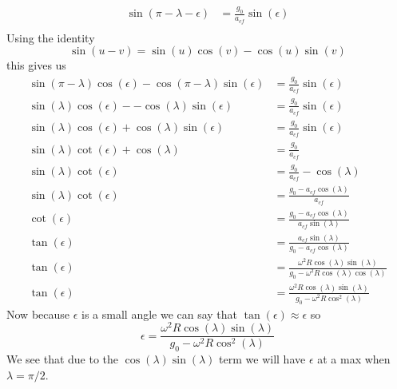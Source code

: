 \documentclass[11pt]{article}
\numberwithin{equation}{section}
\begin{document}
\begin{enumerate}
\begin{align*}
 {\sin(\pi-\lambda-\epsilon)}&= \frac{g_0}{a_{cf}}{\sin(\epsilon)}\\
\end{align*}
Using the identity
$$\sin(u-v) = \sin(u)\cos(v)-\cos(u)\sin(v)$$
this gives us
\begin{align*}
 {\sin(\pi-\lambda)\cos(\epsilon)}- {\cos(\pi-\lambda)\sin(\epsilon)}&= \frac{g_0}{a_{cf}}{\sin(\epsilon)}\\
 {\sin(\lambda)\cos(\epsilon)}- -\cos(\lambda)\sin(\epsilon)&= \frac{g_0}{a_{cf}}{\sin(\epsilon)}\\
 {\sin(\lambda)\cos(\epsilon)}+\cos(\lambda)\sin(\epsilon)&= \frac{g_0}{a_{cf}}{\sin(\epsilon)}\\
 \sin(\lambda)\cot(\epsilon)+\cos(\lambda)&= \frac{g_0}{a_{cf}}\\
 \sin(\lambda)\cot(\epsilon)&= \frac{g_0}{a_{cf}}-\cos(\lambda)\\
 \sin(\lambda)\cot(\epsilon)&= \frac{g_0-a_{cf}\cos(\lambda)}{a_{cf}}\\
 \cot(\epsilon)&= \frac{g_0-a_{cf}\cos(\lambda)}{a_{cf}\sin(\lambda)}\\
 \tan(\epsilon)&= \frac{a_{cf}\sin(\lambda)}{g_0-a_{cf}\cos(\lambda)}\\
 \tan(\epsilon)&= \frac{\omega^2R\cos(\lambda)\sin(\lambda)}{g_0-\omega^2R\cos(\lambda)\cos(\lambda)}\\
 \tan(\epsilon)&= \frac{\omega^2R\cos(\lambda)\sin(\lambda)}{g_0-\omega^2R\cos^2(\lambda)}
\end{align*}
Now because $\epsilon$ is a small angle we can say that $\tan(\epsilon) \approx \epsilon$ so
$$\epsilon = \frac{\omega^2R\cos(\lambda)\sin(\lambda)}{g_0-\omega^2R\cos^2(\lambda)}$$
We see that due to the $\cos(\lambda)\sin(\lambda)$ term we will have $\epsilon$ at a max when $\lambda = \pi/2$.

\end{enumerate}
\end{document}
